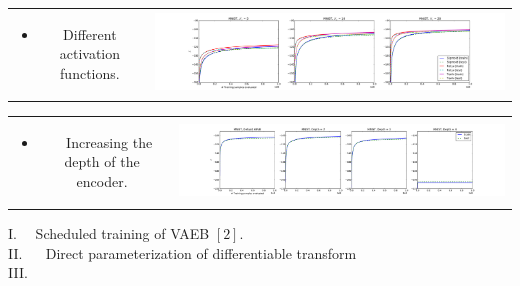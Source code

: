 \documentclass[landscape,a0b,final,a4resizeable]{include/a0poster}
\begin{document}
\begin{poster}
\begin{multicols}{3}
\begin{tabular}{cc}
\begin{minipage}[c]{0.25\columnwidth}
\begin{itemize}
\item Different activation functions.
\end{itemize}
\end{minipage} & 
\begin{minipage}[c]{0.75\columnwidth}
\includegraphics[width=1.0\columnwidth, clip, trim=4mm 0mm 4mm 4mm]{../res/mnist_activations}
\end{minipage}
\end{tabular}

\vspace{0.5em}

\begin{tabular}{cc}
\begin{minipage}[c]{0.25\columnwidth}
\begin{itemize}
\item ~~Increasing the depth of the encoder.
\end{itemize}
\end{minipage} & 
\begin{minipage}[c]{0.75\columnwidth}
\includegraphics[width=1.0\columnwidth, clip, trim=4mm 0mm 4mm 4mm]{../res/mnist_depth}
\end{minipage}
\end{tabular}

\vspace{0.5em}

I.~~ Scheduled training of VAEB $[2]$.\\
II. ~~ Direct parameterization of differentiable transform \\
III. ~~\\
\vspace{0.5em}


\end{multicols}
\end{poster}
\end{document}
